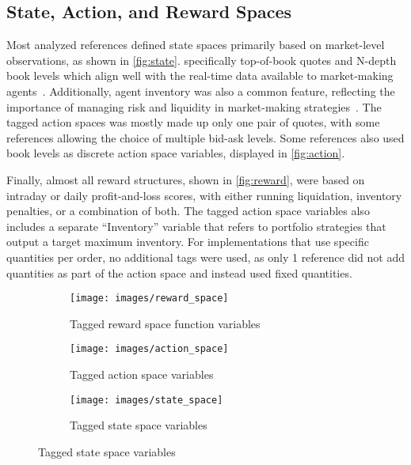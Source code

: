 \subsection{State, Action, and Reward Spaces}
\label{subsec:spaces}

Most analyzed references defined state spaces primarily based on market-level observations, as shown in \autoref{fig:state}.
specifically top-of-book quotes and N-depth book levels which align well with the real-time data available to market-making agents~\cite{He2023, Bakshaev2020}.
Additionally, agent inventory was also a common feature, reflecting the importance of managing risk and liquidity in market-making strategies~\cite{Patel2018, Ganesh2019}.
The tagged action spaces was mostly made up only one pair of quotes, with some references allowing the choice of multiple bid-ask levels.
Some references also used book levels as discrete action space variables, displayed in \autoref{fig:action}.

Finally, almost all reward structures, shown in \autoref{fig:reward},
were based on intraday or daily profit-and-loss scores, with either running liquidation, inventory penalties, or a combination of both.
The tagged action space variables also includes a separate ``Inventory'' variable that refers to portfolio strategies that output a target maximum inventory.
For implementations that use specific quantities per order, no additional tags were used,
as only 1 reference did not add quantities as part of the action space and instead used fixed quantities.

\begin{figure}
    \centering
    \begin{subfigure}{.9\columnwidth}
        \centering
        \texttt{[image: images/reward\_space]}
        \caption{Tagged reward space function variables}
        \label{fig:reward}
    \end{subfigure}
    \vspace{0.5em}
    \begin{subfigure}{.9\columnwidth}
        \centering
        \texttt{[image: images/action\_space]}
        \caption{Tagged action space variables}
        \label{fig:action}
    \end{subfigure}
    \vspace{0.5em} %
    \begin{subfigure}{.9\columnwidth}
        \centering
        \texttt{[image: images/state\_space]}
        \caption{Tagged state space variables}
        \label{fig:state}
    \end{subfigure}
\end{figure}

